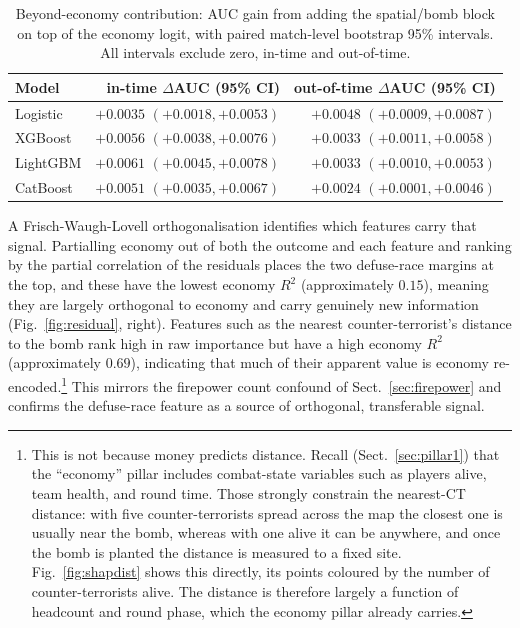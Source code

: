 \documentclass[11pt,a4paper]{article}
\begin{document}
\begin{table}[t]
\centering
\caption{Beyond-economy contribution: AUC gain from adding the spatial/bomb block on top of the economy
logit, with paired match-level bootstrap 95\% intervals. All intervals exclude zero, in-time and
out-of-time.}
\label{tab:residual}
\begin{tabular}{lrr}
\toprule
Model & in-time $\Delta$AUC (95\% CI) & out-of-time $\Delta$AUC (95\% CI) \\
\midrule
Logistic     & $+0.0035$ $(+0.0018, +0.0053)$ & $+0.0048$ $(+0.0009, +0.0087)$ \\
XGBoost      & $+0.0056$ $(+0.0038, +0.0076)$ & $+0.0033$ $(+0.0011, +0.0058)$ \\
LightGBM     & $+0.0061$ $(+0.0045, +0.0078)$ & $+0.0033$ $(+0.0010, +0.0053)$ \\
CatBoost     & $+0.0051$ $(+0.0035, +0.0067)$ & $+0.0024$ $(+0.0001, +0.0046)$ \\
\bottomrule
\end{tabular}
\end{table}

A Frisch-Waugh-Lovell orthogonalisation identifies which features carry that signal. Partialling
economy out of both the outcome and each feature and ranking by the partial correlation of the residuals
places the two defuse-race margins at the top, and these have the lowest economy $R^2$ (approximately
$0.15$), meaning they are largely orthogonal to economy and carry genuinely new information
(Fig.~\ref{fig:residual}, right). Features such as the nearest counter-terrorist's distance to the bomb
rank high in raw importance but have a high economy $R^2$ (approximately $0.69$), indicating that much
of their apparent value is economy re-encoded.\footnote{This is not because money predicts distance.
Recall (Sect.~\ref{sec:pillar1}) that the ``economy'' pillar includes combat-state variables such as
players alive, team health, and round time. Those strongly constrain the nearest-CT distance: with five
counter-terrorists spread across the map the closest one is usually near the bomb, whereas with one
alive it can be anywhere, and once the bomb is planted the distance is measured to a fixed site.
Fig.~\ref{fig:shapdist} shows this directly, its points coloured by the number of counter-terrorists
alive. The distance is therefore largely a function of headcount and round phase, which the economy
pillar already carries.} This mirrors the firepower count confound of
Sect.~\ref{sec:firepower} and confirms the defuse-race feature as a source of orthogonal, transferable
signal.
\end{document}
